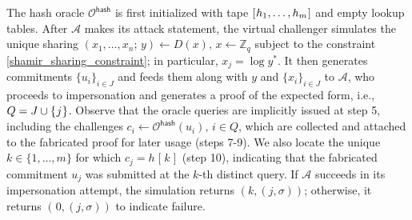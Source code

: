 \documentclass{iacrtrans}
\begin{document}
The hash oracle $\mathcal{O}^{\mathsf{hash}}$
is first initialized with tape
$[\hspace{0.5pt}h_1, \dots, h_m\hspace{0.5pt}]$
and empty lookup tables.
After $\mathcal{A}$ makes its attack statement,
the virtual challenger simulates the unique sharing
$(x_1, \dots, x_n;\hspace{2pt} y) \leftarrow D(x),
\hspace{2pt} x \leftarrow \mathbb{Z}_q$
subject to the constraint \eqref{shamir_sharing_constraint};
in particular, $x_j = \log y^*$.
It then generates commitments
$\{u_i\}_{i \in J}$ and feeds them
along with $y$ and $\{x_i\}_{i \in J}$
to $\mathcal{A}$, who proceeds
to impersonation
and generates a proof of the expected form,
i.e., $Q = J \cup \{\hspace{0.5pt}j\hspace{0.5pt}\}$.
Observe that the oracle queries are implicitly issued
at step 5, including the challenges
$c_i \leftarrow \mathcal{O}^{\mathsf{hash}}(u_i),\hspace{2pt} i \in Q$,
which are collected and attached to the fabricated
proof for later usage (steps 7-9).
We also locate the unique $k \in \{1, \dots, m\}$
for which $c_j = h\hspace{1pt}[\hspace{1pt}k\hspace{1pt}]$
(step 10), indicating that the fabricated commitment $u_j$
was submitted at the $k$-th distinct query.
If $\mathcal{A}$ succeeds in its impersonation attempt,
the simulation returns $(k, (j, \sigma))$; otherwise, it
returns $(\hspace{1pt}0, (j, \sigma))$
to indicate failure.
\end{document}
